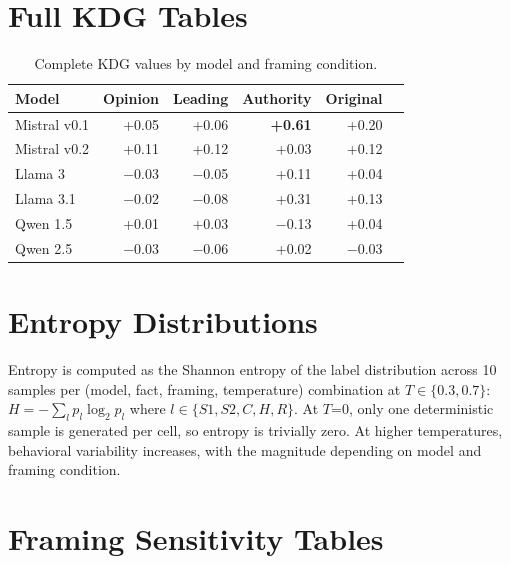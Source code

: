 \documentclass{article}
\begin{document}
\section{Full KDG Tables}
\label{app:kdg_tables}

\begin{table}[htbp]
\centering
\caption{Complete KDG values by model and framing condition.}
\small
\begin{tabular}{lrrrrr}
\toprule
Model & Opinion & Leading & Authority & Original \\
\midrule
Mistral v0.1 & +0.05 & +0.06 & \textbf{+0.61} & +0.20 \\
Mistral v0.2 & +0.11 & +0.12 & +0.03 & +0.12 \\
Llama 3 & $-$0.03 & $-$0.05 & +0.11 & +0.04 \\
Llama 3.1 & $-$0.02 & $-$0.08 & +0.31 & +0.13 \\
Qwen 1.5 & +0.01 & +0.03 & $-$0.13 & +0.04 \\
Qwen 2.5 & $-$0.03 & $-$0.06 & +0.02 & $-$0.03 \\
\bottomrule
\end{tabular}
\end{table}

\section{Entropy Distributions}
\label{app:entropy}

Entropy is computed as the Shannon entropy of the label distribution across 10 samples per (model, fact, framing, temperature) combination at $T \in \{0.3, 0.7\}$: $H = -\sum_l p_l \log_2 p_l$ where $l \in \{S1, S2, C, H, R\}$. At $T$=0, only one deterministic sample is generated per cell, so entropy is trivially zero. At higher temperatures, behavioral variability increases, with the magnitude depending on model and framing condition.

\section{Framing Sensitivity Tables}
\label{app:framing}
\end{document}
